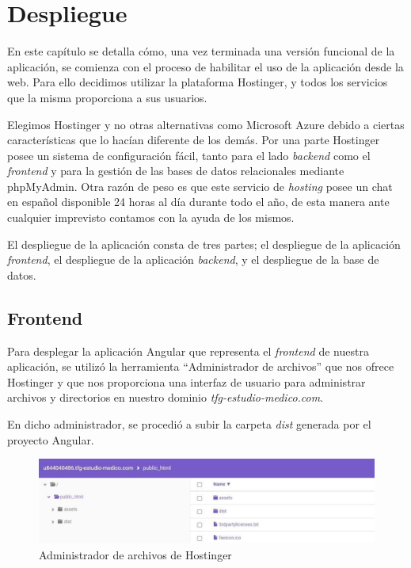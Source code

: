 \chapter{Despliegue}
    En este capítulo se detalla cómo, una vez terminada una versión funcional de la aplicación, se comienza con el proceso de habilitar el uso de la aplicación desde la web. Para ello decidimos utilizar la plataforma Hostinger\cite{hostinger}, y todos los servicios que la misma proporciona a sus usuarios.
    \newline
    
    Elegimos Hostinger y no otras alternativas como Microsoft Azure\cite{azure} debido a ciertas características que lo hacían diferente de los demás. Por una parte Hostinger posee un sistema de  configuración fácil, tanto para el lado \textit{backend} como el \textit{frontend} y para la gestión de las bases de datos relacionales mediante phpMyAdmin. Otra razón de peso es que este servicio de \textit{hosting} posee un chat en español disponible 24 horas al día durante todo el año, de esta manera ante cualquier imprevisto contamos con la ayuda de los mismos. \newline
    
    El despliegue de la aplicación consta de tres partes; el despliegue de la aplicación \textit{frontend}, el despliegue de la aplicación \textit{backend}, y el despliegue de la base de datos.
    
    \section{Frontend}
    Para desplegar la aplicación Angular que representa el \textit{frontend} de nuestra aplicación, se utilizó la herramienta ``Administrador de archivos'' que nos ofrece Hostinger y que nos proporciona una interfaz de usuario para administrar archivos y directorios en nuestro dominio \textit{tfg-estudio-medico.com}.
    \newline
    
    En dicho administrador, se procedió a subir la carpeta \textit{dist} generada por el proyecto Angular.
    
     \begin{figure}[h]
    \centering
     \includegraphics[width=1\textwidth]{images/administradorarchivos3.jpg}
    \caption{Administrador de archivos de Hostinger}
    \end{figure}
    

